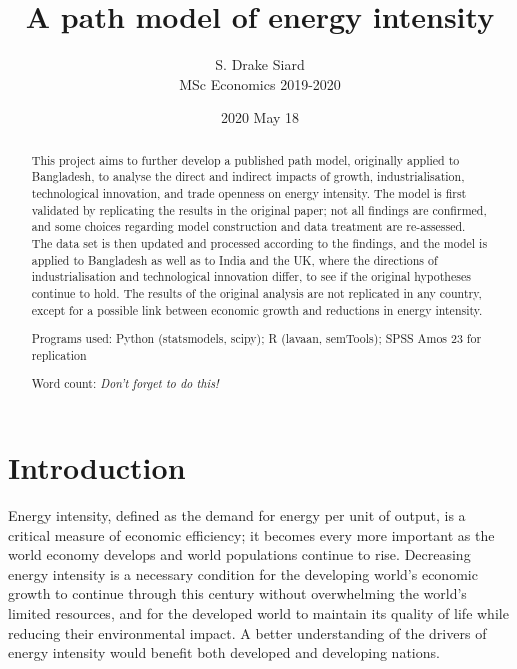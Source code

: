 \documentclass[11pt,a4paper]{article}
\title{\textbf{A path model of energy intensity}}
\author{S. Drake Siard\\
MSc Economics 2019-2020}
\date{2020 May 18}
\newcommand{\pkg}[1]{{\fontseries{b}\selectfont #1}}
\begin{document}
\maketitle

\begin{abstract}
This project aims to further develop a published path model, originally applied to Bangladesh, to analyse the direct and indirect impacts of growth, industrialisation, technological innovation, and trade openness on energy intensity.
The model is first validated by replicating the results in the original paper; not all findings are confirmed, and some choices regarding model construction and data treatment are re-assessed.
The data set is then updated and processed according to the findings, and the model is applied to Bangladesh as well as to India and the UK, where the directions of industrialisation and technological innovation differ, to see if the original hypotheses continue to hold.
The results of the original analysis are not replicated in any country, except for a possible link between economic growth and reductions in energy intensity.

Programs used: Python (\pkg{statsmodels}, \pkg{scipy}); R (\pkg{lavaan}, \pkg{semTools}); SPSS Amos 23 for replication

Word count: \em{Don't forget to do this!}
 
\end{abstract}

\tableofcontents

\pagebreak

\section{Introduction}\label{sec:introduction}

Energy intensity, defined as the demand for energy per unit of output, is a critical measure of economic efficiency; it becomes every more important as the world economy develops and world populations continue to rise.
Decreasing energy intensity is a necessary condition for the developing world's economic growth to continue through this century without overwhelming the world's limited resources, and for the developed world to maintain its quality of life while reducing their environmental impact.
A better understanding of the drivers of energy intensity would benefit both developed and developing nations.
\end{document}
